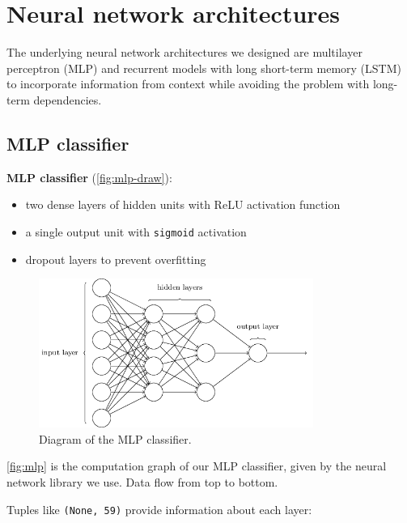 \documentclass[11pt,a4paper]{report}
\begin{document}
\newpage

\section{Neural network architectures}

The underlying neural network architectures we designed are multilayer perceptron (MLP) and recurrent models with long short-term memory (LSTM) \parencite{hochreiter1997long} to incorporate information from context while avoiding the problem with long-term dependencies.

\subsection{MLP classifier}

\begin{mdframed}
\noindent \textbf{MLP classifier} (\autoref{fig:mlp-draw}):
\begin{itemize}
  \item two dense layers of hidden units with ReLU \parencite{nair2010rectified} activation function
  \item a single output unit with \texttt{sigmoid} activation
  \item dropout \parencite{srivastava2014dropout} layers to prevent overfitting
\end{itemize}
\end{mdframed}

\begin{figure}[htbp]
  \centering
  \includegraphics[width=0.8\textwidth]{mlp.png}
  \caption{Diagram of the MLP classifier.} \label{fig:mlp-draw}
\end{figure}

\autoref{fig:mlp} is the computation graph of our MLP classifier, given by the neural network library we use.
Data flow from top to bottom.

Tuples like \texttt{(None, 59)} provide information about each layer:
\end{document}
